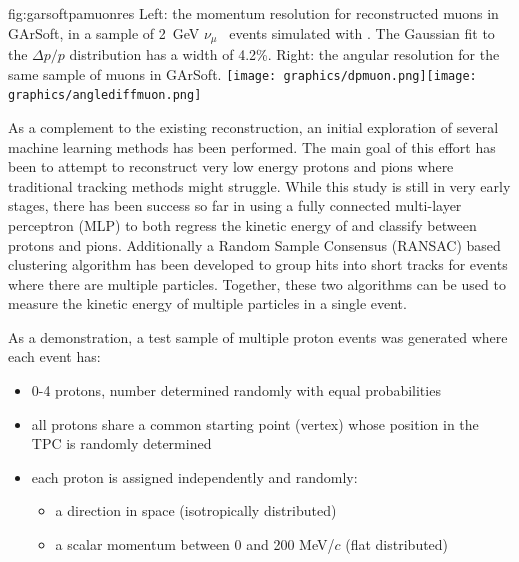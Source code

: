 \begin{dunefigure}{fig:garsoftpamuonres}
{Left: the momentum resolution for reconstructed muons in GArSoft, in a sample of \SI{2}{GeV} $\nu_\mu$~ events simulated with .  The Gaussian fit to the $\Delta p/p$ distribution has a width of 4.2\%. Right:  the \threed angular resolution for the same sample of muons in GArSoft.}
\texttt{[image: graphics/dpmuon.png]}\texttt{[image: graphics/anglediffmuon.png]} 
\end{dunefigure}

\label{sec:TPC_ML}                                                     

As a complement to the existing reconstruction, an initial exploration of several machine learning methods has been performed.
The main goal of this effort has been to attempt to reconstruct very low energy protons and pions where traditional           
tracking methods might struggle.   
While this study is still in very early stages, there has been success so far in using a fully connected multi-layer perceptron (MLP) to both regress
the kinetic energy of and classify between protons and pions.  Additionally a Random Sample Consensus (RANSAC) based          
clustering algorithm has been developed to group hits into short tracks for events where there are multiple particles.        
Together, these two algorithms can be used to measure the kinetic energy of multiple particles in a single event.             

As a demonstration, a test sample of multiple proton events was generated where each event has:
\begin{itemize}
\item 0-4 protons, number determined randomly with equal probabilities
\item all protons share a common starting point (vertex) whose position in the TPC is randomly determined
\item each proton is assigned independently and randomly:
\begin{itemize}
\item a direction in space (isotropically distributed)
\item a scalar momentum between 0 and 200 MeV/$c$ (flat distributed)
\end{itemize}
\end{itemize}

